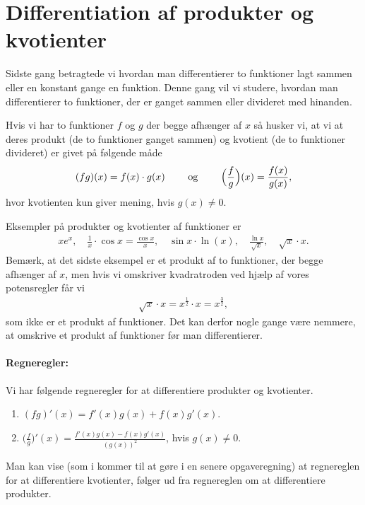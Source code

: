 \section{Differentiation af produkter og kvotienter}
\noindent Sidste gang betragtede vi hvordan man differentierer to funktioner lagt sammen eller en konstant gange en funktion. Denne gang vil vi studere, hvordan man differentierer to funktioner, der er ganget sammen eller divideret med hinanden.

Hvis vi har to funktioner $f$ og $g$ der begge afhænger af $x$ så husker vi, at vi at deres produkt (de to funktioner ganget sammen) og kvotient (de to funktioner divideret) er givet på følgende måde
\begin{align*}
(fg)(x)=f(x) \cdot g(x) \qquad \textup{ og } \qquad \Big(\frac{f}{g}\Big) (x) = \frac{f(x)}{g(x)},
\end{align*}
hvor kvotienten kun giver mening, hvis $g(x) \neq 0$.

Eksempler på produkter og kvotienter af funktioner er
\begin{align*}
xe^x, \quad \frac{1}{x} \cdot \cos x = \frac{\cos x}{x},\quad \sin x \cdot \ln(x),\quad \frac{\ln x}{\sqrt{x}}, \quad \sqrt{x}\cdot x.
\end{align*}
Bemærk, at det sidste eksempel er et produkt af to funktioner, der begge afhænger af $x$, men hvis vi omskriver kvadratroden ved hjælp af vores potensregler får vi
\begin{align*}
\sqrt{x}\cdot x = x^{\frac{1}{2}} \cdot x = x^\frac{3}{2},
\end{align*}
som ikke er et produkt af funktioner. Det kan derfor nogle gange være nemmere, at omskrive et produkt af funktioner før man differentierer.

\paragraph*{Regneregler:}
Vi har følgende regneregler for at differentiere produkter og kvotienter.
\begin{enumerate}
\item $(fg)'(x)=f'(x)g(x)+f(x)g'(x)$.
\item $\displaystyle \Big( \frac{f}{g} \Big)'(x) = \frac{f'(x)g(x)-f(x)g'(x)}{(g(x))^2}$, hvis $g(x) \neq 0$.
\end{enumerate}
Man kan vise (som i kommer til at gøre i en senere opgaveregning) at regnereglen for at differentiere kvotienter, følger ud fra regnereglen om at differentiere produkter.

